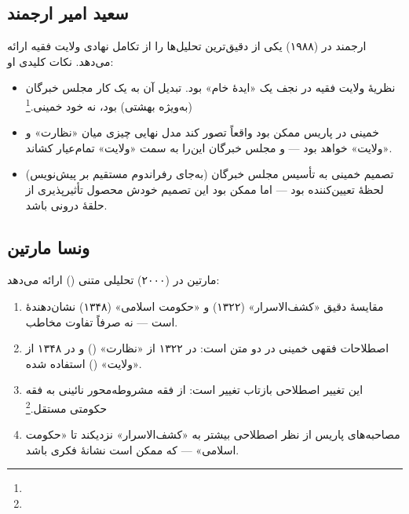 \subsection{سعید امیر ارجمند}

ارجمند در  (۱۹۸۸) یکی از دقیق‌ترین تحلیل‌ها را از تکامل نهادی ولایت فقیه ارائه می‌دهد. نکات کلیدی او:

\begin{itemize}[label=\textcolor{cGold}{$\blacktriangleright$}, rightmargin=2em]
    \item نظریهٔ ولایت فقیه در نجف یک «ایدهٔ خام» بود. تبدیل آن به یک  کار مجلس خبرگان (به‌ویژه بهشتی) بود، نه خود خمینی.\footnote{}
    \item خمینی در پاریس ممکن بود واقعاً تصور کند مدل نهایی چیزی میان «نظارت» و «ولایت» خواهد بود — و مجلس خبرگان این‌را به سمت «ولایت» تمام‌عیار کشاند.
    \item تصمیم خمینی به تأسیس مجلس خبرگان (به‌جای رفراندوم مستقیم بر پیش‌نویس) لحظهٔ تعیین‌کننده بود — اما ممکن بود این تصمیم خودش محصول تأثیرپذیری از حلقهٔ درونی باشد.
\end{itemize}

\subsection{ونسا مارتین}

مارتین در  (۲۰۰۰) تحلیلی متنی () ارائه می‌دهد:

\begin{noteBox}
\begin{enumerate}[label=\textcolor{cGold}{\bfseries\arabic*.}, rightmargin=2em]
    \item مقایسهٔ دقیق «کشف‌الاسرار» (۱۳۲۲) و «حکومت اسلامی» (۱۳۴۸) نشان‌دهندهٔ  است — نه صرفاً تفاوت مخاطب.
    \item اصطلاحات فقهی خمینی در دو متن  است: در ۱۳۲۲ از «نظارت» () و در ۱۳۴۸ از «ولایت» () استفاده شده.
    \item این تغییر اصطلاحی بازتاب تغییر  است: از فقه مشروطه‌محور نائینی به فقه حکومتی مستقل.\footnote{}
    \item مصاحبه‌های پاریس از نظر اصطلاحی بیشتر به «کشف‌الاسرار» نزدیکند تا «حکومت اسلامی» — که ممکن است نشانهٔ  فکری باشد.
\end{enumerate}
\end{noteBox}

